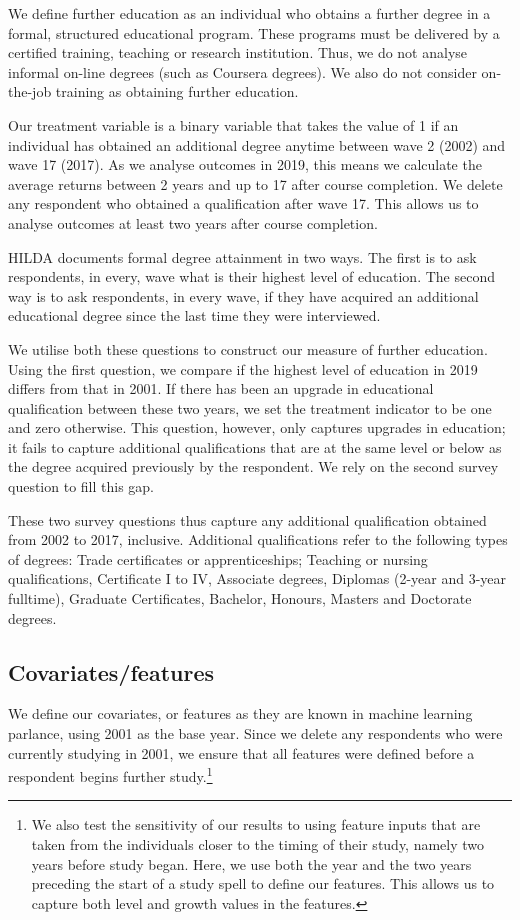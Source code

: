 \documentclass[12pt, a4paper]{article}
\begin{document}
We define further education as an individual who obtains a further degree in a formal, structured educational program. These programs must be delivered by a certified training, teaching or research institution. Thus, we do not analyse informal on-line degrees (such as Coursera degrees). We also do not consider on-the-job training as obtaining further education.

Our treatment variable is a binary variable that takes the value of 1 if an individual has obtained an additional degree anytime between wave 2 (2002) and wave 17 (2017). As we analyse outcomes in 2019, this means we calculate the average returns between 2 years and up to 17 after course completion. We delete any respondent who obtained a qualification after wave 17. This allows us to analyse outcomes at least two years after course completion.


HILDA documents formal degree attainment in two ways. The first is to ask respondents, in every, wave what is their highest level of education. The second way is to ask respondents, in every wave, if they have acquired an additional educational degree since the last time they were interviewed.

We utilise both these questions to construct our measure of further education. Using the first question, we compare if the highest level of education in 2019 differs from that in 2001. If there has been an upgrade in educational qualification between these two years, we set the treatment indicator to be one and zero otherwise. This question, however, only captures upgrades in education; it fails to capture additional qualifications that are at the same level or below as the degree acquired previously by the respondent. We rely on the second survey question to fill this gap.

These two survey questions thus capture any additional qualification obtained from 2002 to 2017, inclusive. Additional qualifications refer to the following types of degrees: Trade certificates or apprenticeships; Teaching or nursing qualifications, Certificate I to IV, Associate degrees, Diplomas (2-year and 3-year fulltime), Graduate Certificates, Bachelor, Honours, Masters and Doctorate degrees.

\subsection{Covariates/features}

We define our covariates, or features as they are known in machine learning
parlance, using 2001 as the base year. Since we delete any respondents who were
currently studying in 2001, we ensure that all features were defined before a
respondent begins further study.\footnote{We also test the sensitivity of our results to using feature inputs that are taken from the individuals closer to the timing of their study, namely two years before study began. Here, we use both the year and the two years preceding the start of a study spell to define our features. This allows us to capture both level and growth values in the features.}
\end{document}
